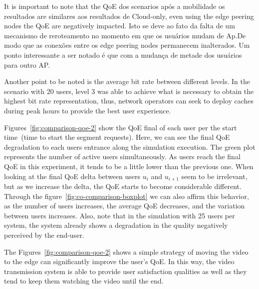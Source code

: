 It is important to note that the QoE dos scenarios após a mobilidade os resultados are similares aos resultados de Cloud-only, even using the edge peering nodes the QoE are negatively impacted. Isto se deve ao fato da falta de um mecanismo de reroteamento no momento em que os  usuários mudam de Ap.De modo que as conexões entre os edge peering nodes permanecem inalterados. Um ponto interessante a ser notado é que com a mudança de metade dos usuários para outro AP.

Another point to be noted is the average bit rate between different levels. In the scenario with 20 users, level 3 was able to achieve what is necessary to obtain the highest bit rate representation, thus, network operators can seek to deploy caches during peak hours to provide the best user experience.

Figures~\ref{fig:comparison-qoe-2} show the QoE final of each user per the start time~(time to start the segment requests). Here, we can see the final QoE degradation to each users entrance along the simulation execution. The green plot represents the number of active users simultaneously.  
As users reach the final QoE in this experiment, it tends to be a little lower than the previous one. When looking at the final QoE delta between users $u_{i}$ and $u_{i + 1}$ seem to be irrelevant, but as we increase the delta, the QoE starts to become considerable different. Through the figure~\ref{fig:co-comparison-boxplot} we can also affirm this behavior, as the number of users increases, the average QoE decreases, and the variation between users increases. Also, note that in the simulation with 25 users per system, the system already shows a degradation in the quality negatively perceived by the end-user.


The Figures~\ref{fig:comparison-qoe-2} shows a simple strategy of moving the video to the edge can significantly improve the user's QoE. In this way, the video transmission system is able to provide user satisfaction qualities as well as they tend to keep them watching the video until the end. 

